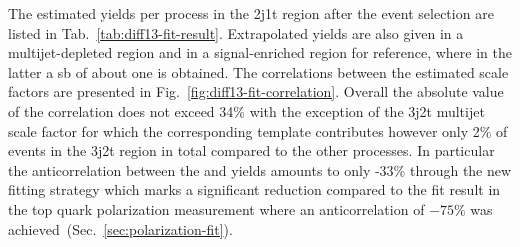 The estimated yields per process in the 2j1t region after the event selection are listed in Tab.~\ref{tab:diff13-fit-result}. Extrapolated yields are also given in a multijet-depleted region and in a signal-enriched region for reference, where in the latter a \gls{sb} of about one is obtained. The correlations between the estimated scale factors are presented in Fig.~\ref{fig:diff13-fit-correlation}. Overall the absolute value of the correlation does not exceed 34\% with the exception of the 3j2t multijet scale factor for which the corresponding template contributes however only 2\% of events in the 3j2t region in total compared to the other processes. In particular the anticorrelation between the \wjets and \ttbar yields amounts to only -33\% through the new fitting strategy which marks a significant reduction compared to the fit result in the top quark polarization measurement where an anticorrelation of $-75\%$ was achieved~(Sec.~\ref{sec:polarization-fit}).



